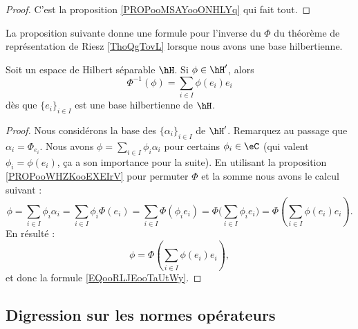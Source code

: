 \begin{proof}
    C'est la proposition \ref{PROPooMSAYooONHLYq} qui fait tout.
\end{proof}

La proposition suivante donne une formule pour l'inverse du \( \Phi\) du théorème de représentation de Riesz \ref{ThoQgTovL} lorsque nous avons une base hilbertienne.
\begin{proposition}
    Soit un espace de Hilbert séparable \( \hH\). Si \( \phi\in \hH'\), alors
    \begin{equation}    \label{EQooRLJEooTaUtWy}
        \Phi^{-1}(\phi)=\sum_{i\in I}\phi(e_i)e_i
    \end{equation}
    dès que \( \{ e_i \}_{i\in I}\) est une base hilbertienne de \( \hH\).
\end{proposition}

\begin{proof}
    Nous considérons la base des \( \{ \alpha_i \}_{i\in I}\) de \( \hH'\). Remarquez au passage que \( \alpha_i=\Phi_{e_i}\).  Nous avons \( \phi=\sum_{i\in I}\phi_i\alpha_i\) pour certains \( \phi_i\in \eC\) (qui valent \( \phi_i=\phi(e_i)\), ça a son importance pour la suite). En utilisant la proposition \ref{PROPooWHZKooEXEIrV} pour permuter \( \Phi\) et la somme nous avons le calcul suivant :
    \begin{equation}
        \phi=\sum_{i\in I}\phi_i\alpha_i=\sum_{i\in I}\phi_i\Phi(e_i)=\sum_{i\in I}\Phi(\phi_ie_i)=\Phi\big( \sum_{i\in I}\phi_ie_i \big)=\Phi(\sum_{i\in I}\phi(e_i)e_i).
    \end{equation}
    En résulté :
    \begin{equation}
        \phi=\Phi(\sum_{i\in I}\phi(e_i)e_i),
    \end{equation}
    et donc la formule \eqref{EQooRLJEooTaUtWy}.
\end{proof}

\subsection{Digression sur les normes opérateurs}
\label{subsecaeSywF}

